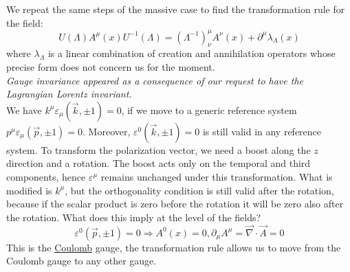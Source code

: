 \documentclass[../main.tex]{subfiles}
\begin{document}
We repeat the same steps of the massive case to find the transformation rule for the field:
\[
U(\Lambda)A^\mu(x)U^{-1}(\Lambda)=(\Lambda^{-1})^\mu_\nu A^\nu(x)+\partial^\mu\lambda_\Lambda(x)
\]
where $\lambda_\Lambda$ is a linear combination of creation and annihilation operators whose precise form does not concern us for the moment.\\ 
\textit{Gauge invariance appeared as a consequence of our request to have the Lagrangian Lorentz invariant.}\\
We have $k^\mu\varepsilon_\mu(\vec{k},\pm1)=0$, if we move to a generic reference system $p^\mu\varepsilon_\mu(\vec{p},\pm1)=0$. Moreover, $\varepsilon^0(\vec{k},\pm1)=0$ is still valid in any reference system. To transform the polarization vector, we need a boost along the $z$ direction and a rotation. The boost acts only on the temporal and third components, hence $\varepsilon^\mu$ remains unchanged under this transformation. What is modified is $k^\mu$, but the orthogonality condition is still valid after the rotation, because if the scalar product is zero before the rotation it will be zero also after the rotation. What does this imply at the level of the fields? 
\[
\varepsilon^0(\vec{p},\pm1)=0\Rightarrow A^0(x)=0, \partial_\mu A^\mu=\vec{\nabla}\cdot\vec{A}=0
\]
This is the \href{https://en.wikipedia.org/wiki/Charles-Augustin_de_Coulomb}{Coulomb} gauge, the transformation rule allows us to move from the Coulomb gauge to any other gauge.
\end{document}
